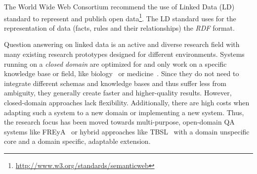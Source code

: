 \documentclass{acm_proc_article-sp}
\newtheorem{definition}{Definition}
\begin{document}
The World Wide Web Consortium recommend the use of Linked Data (LD) standard to represent and publish open data\footnote{\url{http://www.w3.org/standards/semanticweb}}.
The LD standard uses for the representation of data (facts, rules and their relationships) the \emph{RDF} format.

Question answering on linked data is an active and diverse research field with many existing research prototypes designed for different environments.
Systems running on a \emph{closed domain} are optimized for and only work on a specific knowledge base or field, like biology~\cite{biomedicalqa} or medicine~\cite{medicalqa}.
Since they do not need to integrate different schemas and knowledge bases and thus suffer less from ambiguity, they generally create faster and higher-quality results.
However, closed-domain approaches lack flexibility.
Additionally, there are high costs when adapting such a system to a new domain or implementing a new system.
Thus, the research focus has been moved towards multi-purpose, open-domain QA systems like FREyA~\cite{freya} or hybrid approaches like TBSL~\cite{unger2012template} with a domain unspecific core and a domain specific, adaptable extension.
\end{document}
